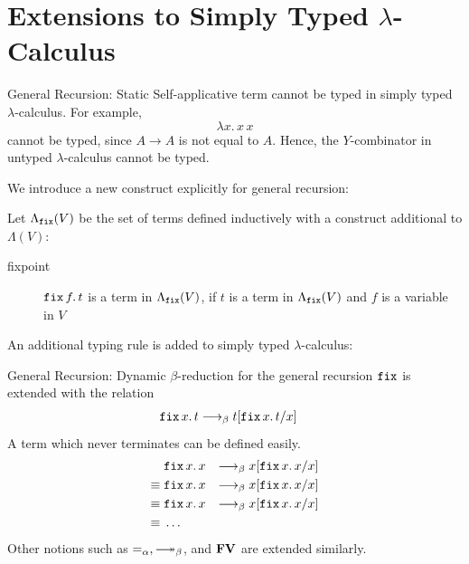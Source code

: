 \section{Extensions to Simply Typed \texorpdfstring{$\lambda$}{λ}-Calculus}


\begin{frame}{General Recursion: Static}
  Self-applicative term cannot be typed in simply typed $\lambda$-calculus.
  For example, 
  \[
    \lambda x.\, x\,x
  \]
  cannot be typed, since $A \to A$ is not equal to $A$.
  Hence, the $Y$-combinator in untyped $\lambda$-calculus cannot be typed.

  We introduce a new construct explicitly for general recursion:

  Let $\Lambda_{\fix}(V)$ be the set of terms defined inductively with a construct additional to $\Lambda(V)$:
  \begin{description}
    \item[fixpoint] $\fix\,f.\, t$ is a term in $\Lambda_{\fix}(V)$, if $t$ is a term in $\Lambda_{\fix}(V)$ and $f$ is a variable in $V$
  \end{description}

  An additional typing rule is added to simply typed $\lambda$-calculus:
  \begin{prooftree}
  \end{prooftree}
\end{frame}

\begin{frame}{General Recursion: Dynamic}
  $\beta$-reduction for the general recursion $\fix$ is extended with the relation
  \begin{align*}
    \fix\,x.\,t & \onereduce t\subst{\fix\,x.\,t}{x}
  \end{align*}
  \vfill
  A term which never terminates can be defined easily.
  \begin{align*}
             & \fix\,x.\,x & \onereduce x\subst{\fix\,x.\,x}{x} \\
    \equiv{} & \fix\,x.\,x & \onereduce x\subst{\fix\,x.\,x}{x} \\
    \equiv{} & \fix\,x.\,x & \onereduce x\subst{\fix\,x.\,x}{x} \\
    \equiv{} & \dots
  \end{align*}
  \vfill
  Other notions such as $=_\alpha, \reduce$, and $\FV$ are extended similarly.
\end{frame}


